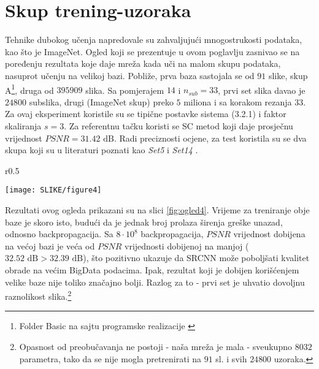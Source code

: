 \documentclass[12pt]{report}
\numberwithin{equation}{section}
\begin{document}
  \section{Skup trening-uzoraka}


  
  Tehnike dubokog učenja napredovale su zahvaljujući mnogostrukosti podataka, kao što je ImageNet. Ogled koji se prezentuje u ovom poglavlju zasnivao se na poređenju rezultata koje daje mreža kada uči na malom skupu podataka, nasuprot učenju na velikoj bazi. Pobliže, prva baza sastojala se od $91$ slike, skup A\footnote{Folder Basic na sajtu programske realizacije \cite{samples}}, druga od $395 909$ slika. Sa pomjerajem $14$ i $n_{sub}=33$, prvi set slika davao je $24 800$ subslika, drugi (ImageNet skup) preko $5$ miliona i sa korakom rezanja $33$. Za ovaj eksperiment koristile su se tipične postavke sistema (3.2.1) i faktor skaliranja $s = 3$. Za referentnu tačku koristi se SC metod \cite{sparse1} koji daje prosječnu vrijednost $PSNR = 31.42\text{ dB}$.  Radi preciznosti ocjene, za test koristila su se dva skupa koji su u literaturi poznati kao \textit{Set5} i \textit{Set14} \cite{samples}.

    \begin{wrapfigure}{r}{0.5\textwidth} 
  \begin{center}
    \texttt{[image: SLIKE/figure4]}
  \end{center}
  \caption{Treniranje na većoj bazi popravlja performanse}
  \label{fig:ogled4}
\end{wrapfigure}
Rezultati ovog ogleda prikazani su na slici \ref{fig:ogled4}. Vrijeme za treniranje obje baze je skoro isto, budući da je jednak broj prolaza širenja greške unazad, odnosno backpropagacija. Sa $8 \cdot 10^8$ backpropagacija, $PSNR$ vrijednost dobijena na većoj bazi je veća od $PSNR$ vrijednosti dobijenoj na manjoj ($32.52 \text{ dB} > 32.39 \text{ dB}$), što pozitivno ukazuje da SRCNN može poboljšati kvalitet obrade na većim BigData podacima. Ipak, rezultat koji je dobijen korišćenjem velike baze nije toliko značajno bolji. Razlog za to - prvi set je uhvatio dovoljnu raznolikost slika.\footnote{Opasnost od preobučavanja ne postoji - naša mreža je mala - sveukupno $8 032$ parametra, tako da se nije mogla pretrenirati na $91$ sl. i svih $24 800$ uzoraka.} 
    
  
\end{document}
